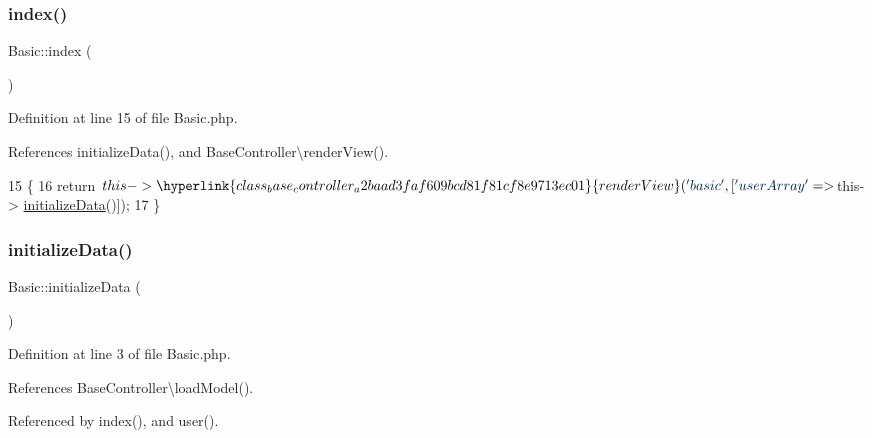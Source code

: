 \subsubsection{\texorpdfstring{index()}{index()}}
{\footnotesize\ttfamily Basic\+::index (\begin{DoxyParamCaption}{ }\end{DoxyParamCaption})}



Definition at line 15 of file Basic.\+php.



References initialize\+Data(), and Base\+Controller\textbackslash{}render\+View().


\begin{DoxyCode}
15                             \{
16         \textcolor{keywordflow}{return} $this->\hyperlink{class_base_controller_a2baad3faf609bcd81f81cf8e9713ec01}{renderView}(\textcolor{stringliteral}{'basic'}, [\textcolor{stringliteral}{'userArray'} => $this->
      \hyperlink{class_basic_a9d1fa71862cb93e3a2e89806c32520a5}{initializeData}()]);
17     \}
\end{DoxyCode}
\hypertarget{class_basic_a9d1fa71862cb93e3a2e89806c32520a5}{}\label{class_basic_a9d1fa71862cb93e3a2e89806c32520a5} 
\subsubsection{\texorpdfstring{initialize\+Data()}{initializeData()}}
{\footnotesize\ttfamily Basic\+::initialize\+Data (\begin{DoxyParamCaption}{ }\end{DoxyParamCaption})}



Definition at line 3 of file Basic.\+php.



References Base\+Controller\textbackslash{}load\+Model().



Referenced by index(), and user().



